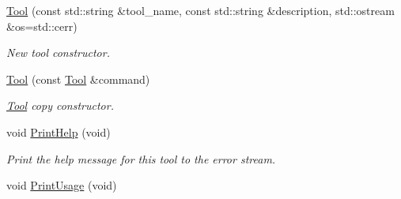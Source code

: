\begin{DoxyCompactItemize}
\item 
\hyperlink{classtool_1_1Tool_a23c21bf943629dda5c3493904a2f6c98}{Tool} (const std\+::string \&tool\+\_\+name, const std\+::string \&description, std\+::ostream \&os=std\+::cerr)
\begin{DoxyCompactList}\small\item\em New tool constructor. \end{DoxyCompactList}\item 
\hyperlink{classtool_1_1Tool_a6ff41f1b821715bd510b6f5b0f92ee51}{Tool} (const \hyperlink{classtool_1_1Tool}{Tool} \&command)
\begin{DoxyCompactList}\small\item\em \hyperlink{classtool_1_1Tool}{Tool} copy constructor. \end{DoxyCompactList}\item 
void \hyperlink{classtool_1_1Tool_a793db31f3e5cec35c8b223cbd7187865}{Print\+Help} (void)\hypertarget{classtool_1_1Tool_a793db31f3e5cec35c8b223cbd7187865}{}\label{classtool_1_1Tool_a793db31f3e5cec35c8b223cbd7187865}

\begin{DoxyCompactList}\small\item\em Print the help message for this tool to the error stream. \end{DoxyCompactList}\item 
void \hyperlink{classtool_1_1Tool_a664b73bc60f23aafee63603ae22dc9fe}{Print\+Usage} (void)\hypertarget{classtool_1_1Tool_a664b73bc60f23aafee63603ae22dc9fe}{}\label{classtool_1_1Tool_a664b73bc60f23aafee63603ae22dc9fe}


\end{DoxyCompactItemize}
